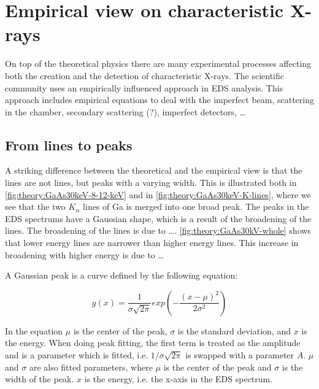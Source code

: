 




%
%
%
%
\section{Empirical view on characteristic X-rays}
\label{sec:theory:empirical}
On top of the theoretical physics there are many experimental processes affecting both the creation and the detection of characteristic X-rays.
The scientific community uses an empirically influenced approach in EDS analysis.
This approach includes empirical equations to deal with the imperfect beam, scattering in the chamber, secondary scattering (?), imperfect detectors, \dots


%
%
\subsection{From lines to peaks}
\label{sec:theory:empirical:peaks}
A striking difference between the theoretical and the empirical view is that the lines are not lines, but peaks with a varying width.
This is illustrated both in \cref{fig:theory:GaAs30keV-8-12-keV} and in \cref{fig:theory:GaAs30keV-K-lines}, where we see that the two $K_\alpha$ lines of Ga is merged into one broad peak.
The peaks in the EDS spectrums have a Gaussian shape, which is a result of the broadening of the lines.
The broadening of the lines is due to \dots {}. %
\cref{fig:theory:GaAs30kV-whole} shows that lower energy lines are narrower than higher energy lines.
This increase in broadening with higher energy is due to \dots {}

A Gaussian peak is a curve defined by the following equation:

\begin{equation}
    \label{eq:theory:empirical:gaussian}
    g(x) = \frac{1}{\sigma \sqrt{2\pi}} exp({-\frac{(x-\mu)^2}{2\sigma^2}})
\end{equation}

In the equation $\mu$ is the center of the peak, $\sigma$ is the standard deviation, and $x$ is the energy.
When doing peak fitting, the first term is treated as the amplitude and is a parameter which is fitted, i.e. $1/\sigma\sqrt{2\pi}$ is swapped with a parameter $A$.
$\mu$ and $\sigma$ are also fitted parameters, where $\mu$ is the center of the peak and $\sigma$ is the width of the peak.
$x$ is the energy, i.e. the x-axis in the EDS spectrum.

